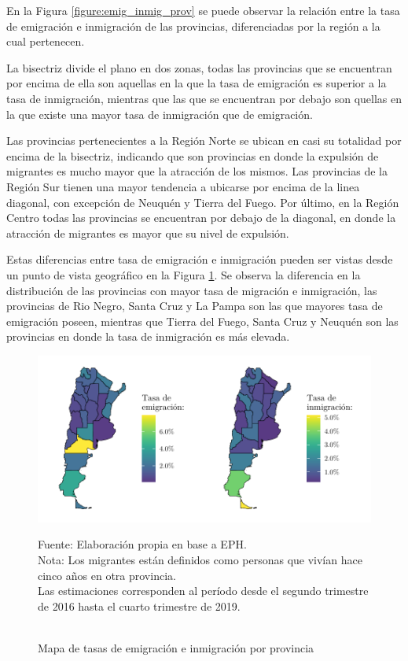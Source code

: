 \documentclass[12pt,a4paper]{article}
\begin{document}
En la Figura \ref{figure:emig_inmig_prov} se puede observar la relación entre la tasa de emigración e inmigración de las provincias, diferenciadas por la región a la cual pertenecen.

La bisectriz divide el plano en dos zonas, todas las provincias que se encuentran por encima de ella son aquellas en la que la tasa de emigración es superior a la tasa de inmigración, mientras que las que se encuentran por debajo son quellas en la que existe una mayor tasa de inmigración que de emigración. 

Las provincias pertenecientes a la Región Norte se ubican en casi su totalidad por encima de la bisectriz, indicando que son provincias en donde la expulsión de migrantes es mucho mayor que la atracción de los mismos. Las provincias de la Región Sur tienen una mayor tendencia a ubicarse por encima de la linea diagonal, con excepción de Neuquén y Tierra del Fuego. Por último, en la Región Centro todas las provincias se encuentran por debajo de la diagonal, en donde la atracción de migrantes es mayor que su nivel de expulsión.

Estas diferencias entre tasa de emigración e inmigración pueden ser vistas desde un punto de vista geográfico en la Figura \ref{figure:emig_inmig_prov_mapa}. Se observa la diferencia en la distribución de las provincias con mayor tasa de migración e inmigración, las provincias de Rio Negro, Santa Cruz y La Pampa son las que mayores tasa de emigración poseen, mientras que Tierra del Fuego, Santa Cruz y Neuquén son  las provincias en donde la tasa de inmigración es más elevada.
\begin{figure}[htbp!]
\begin{center}
\caption{\\Mapa de tasas de emigración e inmigración por provincia}
\includegraphics[scale=1.1]{./graficos/emig_inmig_por_prov.pdf}
\label{figure:emig_inmig_prov_mapa}
\end{center}
\begin{flushleft}
\begin{scriptsize}
Fuente: Elaboración propia en base a EPH.\\
Nota: Los migrantes están definidos como personas que vivían hace cinco años en otra provincia.\\
Las estimaciones corresponden al período desde el segundo trimestre de 2016 hasta el cuarto trimestre de 2019.\\
\end{scriptsize}
\end{flushleft}
\end{figure}
\newpage
\end{document}
